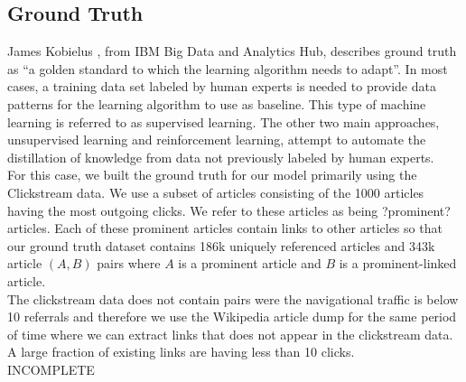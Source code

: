 \subsection{Ground Truth}

James Kobielus \cite{kobielus}, from IBM Big Data and Analytics Hub, describes ground truth as ``a golden standard to which the learning algorithm needs to adapt''. In most cases, a training data set labeled by human experts is needed to provide data patterns for the learning algorithm to use as baseline. This type of machine learning is referred to as supervised learning. The other two main approaches, unsupervised learning and reinforcement learning, attempt to automate the distillation of knowledge from data not previously labeled by human experts. \\

For this case, we built the ground truth for our model primarily using the Clickstream data. We use a subset of articles consisting of the 1000 articles having the most outgoing clicks. We refer to these articles as being ?prominent? articles. Each of these prominent articles contain links to other articles so that our ground truth dataset contains 186k uniquely referenced articles and 343k article $(A,B)$ pairs where $A$ is a prominent article and $B$ is a prominent-linked article. \\

The clickstream data does not contain pairs were the navigational traffic is below 10 referrals and therefore we use the Wikipedia article dump for the same period of time where we can extract links that does not appear in the clickstream data. A large fraction of existing links are having less than 10 clicks. \\

INCOMPLETE